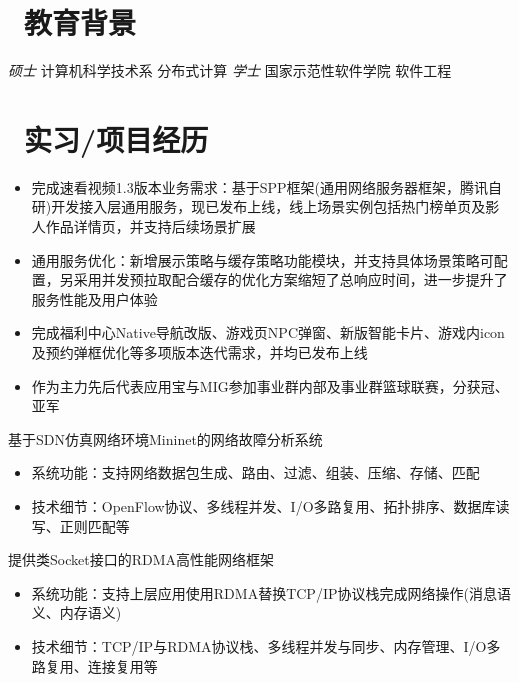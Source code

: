 \documentclass{resume}
\begin{document}
{\section{\faGraduationCap\  教育背景}
\normalsize
\textit{硕士} \quad 计算机科学技术系 \quad 分布式计算
\normalsize
\textit{学士} \quad 国家示范性软件学院 \quad 软件工程

\section{\faUsers\ 实习/项目经历}

\normalsize
{}
\begin{itemize}
  \item 完成速看视频1.3版本业务需求：基于SPP框架(通用网络服务器框架，腾讯自研)开发接入层通用服务，现已发布上线，线上场景实例包括热门榜单页及影人作品详情页，并支持后续场景扩展
  \item 通用服务优化：新增展示策略与缓存策略功能模块，并支持具体场景策略可配置，另采用并发预拉取配合缓存的优化方案缩短了总响应时间，进一步提升了服务性能及用户体验
\end{itemize}

\normalsize
{}
\begin{itemize}
  \item 完成福利中心Native导航改版、游戏页NPC弹窗、新版智能卡片、游戏内icon及预约弹框优化等多项版本迭代需求，并均已发布上线
  \item 作为主力先后代表应用宝与MIG参加事业群内部及事业群篮球联赛，分获冠、亚军
\end{itemize}

\normalsize
{}
基于SDN仿真网络环境Mininet的网络故障分析系统
\begin{itemize}
  \item 系统功能：支持网络数据包生成、路由、过滤、组装、压缩、存储、匹配
  \item 技术细节：OpenFlow协议、多线程并发、I/O多路复用、拓扑排序、数据库读写、正则匹配等
\end{itemize}

\normalsize
{}
提供类Socket接口的RDMA高性能网络框架
\begin{itemize}
  \item 系统功能：支持上层应用使用RDMA替换TCP/IP协议栈完成网络操作(消息语义、内存语义)
  \item 技术细节：TCP/IP与RDMA协议栈、多线程并发与同步、内存管理、I/O多路复用、连接复用等
\end{itemize}

}
\end{document}
